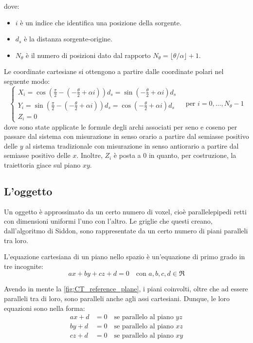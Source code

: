 \documentclass[12pt,a4paper]{report}
\begin{document}
dove:
\begin{itemize}
  \item \(i\) è un indice che identifica una posizione della sorgente.
  \item \(d_s\) è la distanza sorgente-origine.
  \item \(N_\theta\) è il numero di posizioni dato dal rapporto \(N_\theta = \lfloor \theta/\alpha \rfloor + 1\).
\end{itemize}

Le coordinate cartesiane si ottengono a partire dalle coordinate polari nel seguente modo:
\begin{equation} \label{eq:gonometric_source_coordinates}
  \begin{cases}
    X_i = \cos(\frac{\pi}{2} - (-\frac{\theta}{2} + \alpha i)) d_s = \sin(-\frac{\theta}{2} + \alpha i) d_s \\
    Y_i = \sin(\frac{\pi}{2} - (-\frac{\theta}{2} + \alpha i)) d_s = \cos(-\frac{\theta}{2} + \alpha i) d_s \\
    Z_i = 0
  \end{cases} \quad \text{per } i = 0, \dots, N_\theta - 1
\end{equation}
dove sono state applicate le formule degli archi associati per seno e coseno per passare dal sistema con misurazione in senso
orario a partire dal semiasse positivo delle \(y\) al sistema tradizionale con misurazione in senso antiorario a partire dal
semiasse positivo delle \(x\).
Inoltre, \(Z_i\) è posta a \(0\) in quanto, per costruzione, la traiettoria giace sul piano \(xy\).

\subsection{L'oggetto}

Un oggetto è approssimato da un certo numero di voxel, cioè parallelepipedi retti con dimensioni uniformi l'uno con l'altro.
Le griglie che questi creano, dall'algoritmo di Siddon, sono rappresentate da un certo numero di piani paralleli tra loro.

L'equazione cartesiana di un piano nello spazio è un'equazione di primo grado in tre incognite:
\begin{equation*}
  ax + by + cz + d = 0 \quad \text{con } a, b, c, d \in \Re
\end{equation*}

Avendo in mente la \autoref{fig:CT_reference_plane}, i piani coinvolti, oltre che ad essere paralleli tra di loro, sono paralleli
anche agli assi cartesiani.
Dunque, le loro equazioni sono nella forma:
\begin{align*}
  ax + d &= 0 \quad \text{se parallelo al piano } yz \\
  by + d &= 0 \quad \text{se parallelo al piano } xz \\
  cz + d &= 0 \quad \text{se parallelo al piano } xy
\end{align*}
\end{document}
